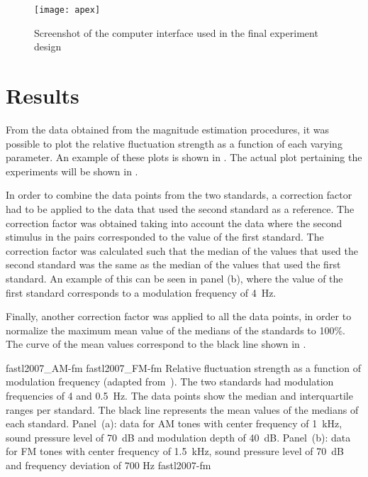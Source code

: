 \documentclass[../main.tex]{subfiles}
\begin{document}
\begin{figure}[!ht]
  \centering
  \texttt{[image: apex]}
  \caption{Screenshot of the computer interface used in the final experiment
    design}
\label{fig:apex}
\end{figure}

\section{Results}

From the data obtained from the magnitude estimation procedures, it was possible
to plot the relative fluctuation strength as a function of each varying
parameter. An example of these plots is shown in . The
actual plot pertaining the experiments will be shown in
.

In order to combine the data points from the two standards, a correction factor
had to be applied to the data that used the second standard as a reference. The
correction factor was obtained taking into account the data where the second
stimulus in the pairs corresponded to the value of the first standard. The
correction factor was calculated such that the median of the values that used
the second standard was the same as the median of the values that used the first
standard. An example of this can be seen in  panel
(b), where the value of the first standard corresponds to a modulation frequency
of 4~Hz.

Finally, another correction factor was applied to all the data points, in order
to normalize the maximum mean value of the medians of the standards to 100\%.
The curve of the mean values correspond to the black line shown in
.

\myfigurepairlabeled%
  {fastl2007_AM-fm}
  {fastl2007_FM-fm}
  {Relative fluctuation strength as a function of modulation frequency (adapted
    from~\cite[pp.248]{Fastl2007Psychoacoustics}). The two standards had
    modulation frequencies of 4 and 0.5~Hz. The data points show the median and
    interquartile ranges per standard. The black line represents the mean values
    of the medians of each standard. Panel~(a): data for \gls{AM} tones with
    center frequency of 1~kHz, sound pressure level of 70~dB and modulation
    depth of 40~dB. Panel~(b): data for \gls{FM} tones with center frequency
    of 1.5~kHz, sound pressure level of 70~dB and frequency deviation of 700 Hz}
  {fastl2007-fm}
\end{document}
